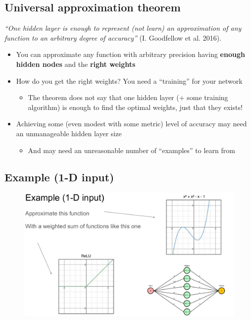 \subsection{Universal approximation theorem}
\textit{“One hidden layer is enough to represent (not learn) an approximation of any function to an arbitrary degree of accuracy”} (I. Goodfellow et al. 2016).\\

\begin{itemize}
	\item You can approximate any function with arbitrary precision having \textbf{enough hidden nodes} and the \textbf{right weights}
	\item How do you get the right weights? You need a “training” for your network
	\begin{itemize}
		\item The theorem does not say that one hidden layer (+ some training algorithm) is enough to find the optimal weights, just that they exists!
	\end{itemize}
	\item Achieving some (even modest with some metric) level of accuracy may need an unmanageable hidden layer size
	\begin{itemize}
		\item And may need an unreasonable number of “examples” to learn from
	\end{itemize}
\end{itemize}

\subsection{Example (1-D input)}

\begin{figure}[ht]
	\centering
	\includegraphics[width=0.9\linewidth]{figure_ml/example1d.png}
\end{figure}
\FloatBarrier


